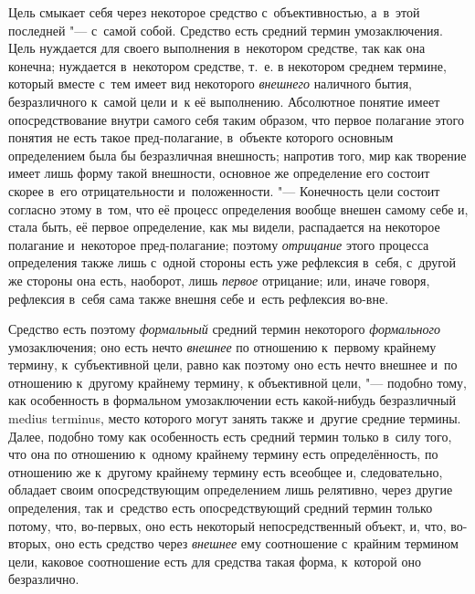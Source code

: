 Цель смыкает себя через некоторое средство с~объективностью,
а~в~этой последней "--- с~самой собой. Средство есть средний
термин умозаключения. Цель нуждается для своего выполнения в~некотором
средстве, так как она конечна; нуждается в~некотором средстве, т.~е. в
некотором среднем термине, который вместе с~тем имеет вид некоторого
{\em внешнего} наличного
бытия, безразличного к~самой цели и~к её выполнению. Абсолютное понятие
имеет опосредствование внутри самого себя таким образом, что первое
полагание этого понятия не есть такое пред-полагание, в~объекте
которого основным определением была бы безразличная внешность; напротив
того, мир как творение имеет лишь форму такой внешности, основное же
определение его состоит скорее в~его отрицательности и~положенности. "---
Конечность цели состоит согласно этому в~том, что её процесс
определения вообще внешен самому себе и, стала быть, её первое определение,
как мы видели, распадается на некоторое полагание и~некоторое
пред-полагание; поэтому {\em отрицание}
этого процесса определения также лишь с~одной стороны есть
уже рефлексия в~себя, с~другой же стороны она есть, наоборот, лишь
{\em первое} отрицание; или, иначе говоря, рефлексия в~себя сама также внешня
себе и~есть рефлексия во-вне.

Средство есть поэтому {\em формальный} средний термин некоторого
{\em формального} умозаключения; оно есть нечто {\em внешнее} по
отношению к~первому крайнему термину, к~субъективной цели, равно как
поэтому оно есть нечто внешнее и~по отношению к~другому крайнему термину, к
объективной цели, "--- подобно тому, как особенность в
формальном умозаключении есть какой-нибудь безразличный medius terminus,
место которого могут занять также и~другие средние термины.
Далее, подобно тому как особенность есть средний термин только в~силу того,
что она по отношению к~одному крайнему термину есть определённость, по
отношению же к~другому крайнему термину есть всеобщее и, следовательно,
обладает своим опосредствующим определением лишь релятивно, через другие
определения, так и~средство есть опосредствующий средний
термин только потому, что, во-первых, оно есть некоторый непосредственный
объект, и, что, во-вторых, оно есть средство через {\em внешнее} ему
соотношение с~крайним термином цели, каковое соотношение есть для средства
такая форма, к~которой оно безразлично.

